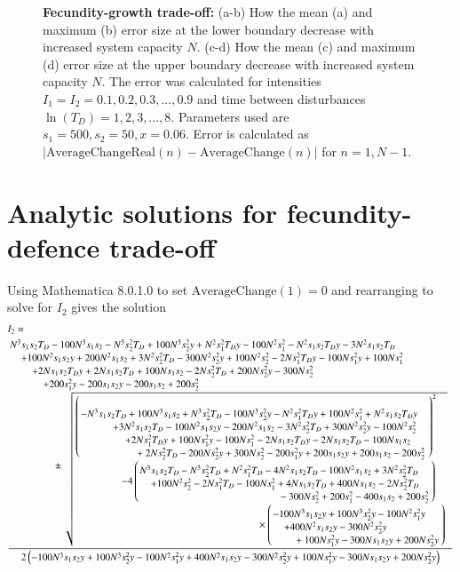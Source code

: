 \documentclass[a4paper]{article}
\begin{document}
\begin{figure}[th]
   \caption[Errors in approximating average change: fecundity-growth trade-off]{\textbf{Fecundity-growth trade-off:} (a-b)  How the mean (a) and maximum (b) error size at the lower boundary decrease with increased system capacity $N$. (c-d) How the mean (c) and maximum (d) error size at the upper boundary decrease with increased system capacity $N$. The error was calculated for intensities $I_1=I_2=0.1,0.2,0.3,...,0.9$ and time between disturbances $\ln(T_D)=1,2,3,...,8.$ Parameters used are $s_1=500,s_2=50,x=0.06$. Error is calculated as $| \text{AverageChangeReal}(n) - \text{AverageChange}(n) |$ for $n=1,N-1$.}
     \label{fig:fecunditygrowtherrors}
   \end{figure}
   
   \section{Analytic solutions for fecundity-defence trade-off}
   \label{app:fdtoroots}
    Using Mathematica 8.0.1.0 to set $\text{AverageChange}(1)=0$ and rearranging to solve for $I_2$ gives the solution
 \begin{align}
 &I_2=\\
 &
\frac{ \splitfrac{N^3 s_1 s_2 T_D - 100 N^3 s_1 s_2 - N^3 s_2^2 T_D + 100 N^3 s_2^2 y + N^2 s_1^2
   T_D y - 100 N^2 s_1^2 - N^2 s_1 s_2 T_D y - 3 N^2 s_1 s_2 T_D }{\splitfrac{+100 N^2 s_1 s_2
   y+ 200 N^2 s_1 s_2+ 3 N^2 s_2^2 T_D- 300 N^2 s_2^2 y+ 100 N^2 s_2^2- 2 N
   s_1^2 T_D y- 100 N s_1^2 y+ 100 N s_1^2}{\splitfrac{+2 N s_1 s_2 T_D y+ 2 N s_1 s_2 T_D+ 100
   N s_1 s_2- 2 N s_2^2 T_D+ 200 N s_2^2 y- 300 N s_2^2}{\splitfrac{+ 200 s_1^2 y- 200 s_1
   s_2 y-200 s_1 s_2+200 s_2^2}{\pm \sqrt{ \splitfrac{ \left( \splitfrac{-N^3
   s_1 s_2 T_D + 100 N^3 s_1 s_2+ N^3 s_2^2 T_D- 100 N^3 s_2^2 y- N^2 s_1^2 T_D
   y +100 N^2 s_1^2+ N^2 s_1 s_2 T_D y}{ \splitfrac{ + 3 N^2 s_1 s_2 T_D- 100 N^2 s_1 s_2 y- 200
   N^2 s_1 s_2- 3 N^2 s_2^2 T_D+ 300 N^2 s_2^2 y- 100 N^2 s_2^2}{ \splitfrac{+ 2 N s_1^2 T_D y+ 100 N  s_1^2 y- 100 N s_1^2-2 N s_1 s_2 T_D y-2 N s_1 s_2 T_D-100 N s_1
   s_2}{+2 N s_2^2 T_D-200 N s_2^2 y+300 N s_2^2-200 s_1^2 y+200 s_1 s_2
   y+200 s_1 s_2-200 s_2^2}}} \right)^2}{\splitfrac{-4 \left(\splitfrac{ N^3 s_1 s_2 T_D-N^3
  s_2^2 T_D+N^2 s_1^2 T_D-4 N^2 s_1 s_2 T_D-100 N^2 s_1 s_2+3 N^2
   s_2^2 T_D}{\splitfrac{+100 N^2 s_2^2-2 N s_1^2 T_D-100 N s_1^2+4 N s_1 s_2 T_D+400 N s_1
   s_2-2 N s_2^2 T_D}{-300 N s_2^2+200 s_1^2-400 s_1 s_2+200 s_2^2}}\right)}
   {\times \left(\splitfrac{-100 N^3 s_1 s_2 y+100 N^3 s_2^2 y-100 N^2 s_1^2 y}{\splitfrac{+400 N^2 s_1 s_2
   y-300 N^2 s_2^2 y}{+100 N s_1^2 y-300 N s_1 s_2 y+200 N s_2^2 y}} \right)}}}}}}}}   {2 \left(-100 N^3 s_1 s_2 y+100 N^3 s_2^2
   y-100 N^2 s_1^2 y+400 N^2 s_1 s_2 y-300 N^2 s_2^2 y+100 N s_1^2 y-300 N s_1
   s_2 y+200 N s_2^2 y \right)} \notag
   \end{align}
\end{document}

